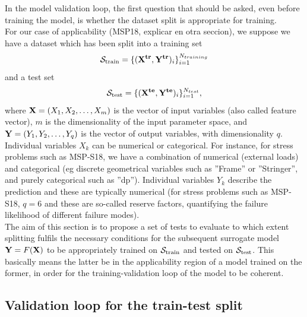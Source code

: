 %
\indent In the model validation loop, the first question that should be asked, even before training the model, is whether the dataset split is appropriate for training.\\
%
\indent For our case of applicability (MSP18, explicar en otra seccion), we suppose we have a dataset which has been split into a training set
$${\cal S}_{\text{train}}=\{({\bf X^{tr}},{\bf Y^{tr}})_i\}_{i=1}^{N_{training}}$$
and a test set
$${\cal S}_{\text{test}}=\{({\bf X^{te}},{\bf Y^{te}})_i\}_{i=1}^{N_{test}},$$
where ${\bf X}=(X_1,X_2,\dots,X_m)$ is the vector of input variables (also called feature vector), $m$ is the dimensionality of the input parameter space, and ${\bf Y}=(Y_1,Y_2,\dots,Y_q)$ is the vector of output variables, with dimensionality $q$. Individual variables $X_k$ can be numerical or categorical. For instance, for stress problems such as MSP-S18, we have a combination of numerical  (\eg external loads) and categorical (eg discrete geometrical variables such as ''Frame'' or ''Stringer'', and purely categorical such as ''dp''). Individual variables $Y_k$ describe the prediction and these are typically numerical (for stress problems such as MSP-S18, $q=6$ and these are so-called reserve factors, quantifying the failure likelihood of different failure modes).\\
%
\indent The aim of this section is to propose a set of tests to evaluate to which extent splitting fulfils the necessary conditions for the subsequent surrogate model ${\bf {Y}}={F}({\bf X})$ to be appropriately trained on ${\cal S}_{\text{train}}$ and tested on ${\cal S}_{\text{test}}$. This basically means the latter be in the applicability region of a model trained on the former, in order for the training-validation loop of the model to be coherent.\\
%
\subsection{Validation loop for the train-test split}
